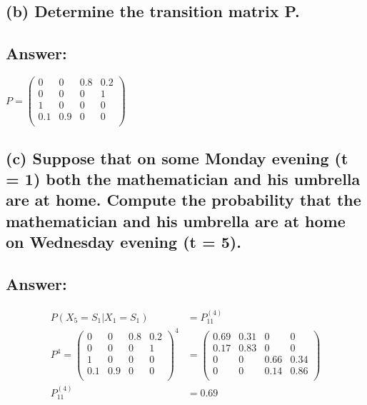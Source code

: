 \documentclass[11px]{article}
\begin{document}
\subsection*{\normalfont (b) Determine the transition matrix P.}

\subsection*{Answer:}

\begin{center}
$
P = 
\begin{pmatrix}
0 & 0 & 0.8 & 0.2 \\
0 & 0 & 0 & 1 \\
1 & 0 & 0 & 0 \\
0.1 & 0.9 & 0 & 0 \\
\end{pmatrix}
$
\end{center}

\subsection*{\normalfont (c) Suppose that on some Monday evening (t = 1) both the mathematician and his umbrella are at home. Compute the probability that the mathematician and his umbrella are at home on Wednesday evening (t = 5).}

\subsection*{Answer: }

\begin{equation}
\begin{split}
P(X_5 = S_1|X_1 = S_1) & = P_{11}^{(4)} \\
P^4 = {
\begin{pmatrix}
0 & 0 & 0.8 & 0.2 \\
0 & 0 & 0 & 1 \\
1 & 0 & 0 & 0 \\
0.1 & 0.9 & 0 & 0 \\
\end{pmatrix}
}^4 & = 
\begin{pmatrix}
0.69 & 0.31 & 0 & 0 \\
0.17 & 0.83 & 0 & 0 \\
0 & 0 & 0.66 & 0.34 \\
0 & 0 & 0.14 & 0.86 \\
\end{pmatrix} \\
P_{11}^{(4)} & = 0.69
\end{split}
\end{equation}
\end{document}
